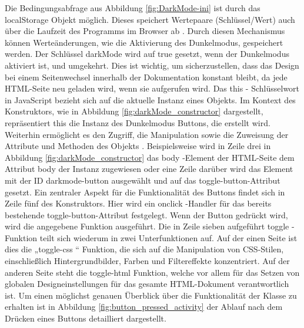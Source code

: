 \documentclass[11pt,a4paper]{report}
\begin{document}
\noindent
Die Bedingungsabfrage aus Abbildung \ref{fig:DarkMode-ini} ist durch das localStorage Objekt möglich. Dieses speichert Wertepaare (Schlüssel/Wert) auch über die Laufzeit des Programms im Browser ab \cite{localStorage_Objekt}. Durch diesen Mechanismus können Werteänderungen, wie die Aktivierung des Dunkelmodus, gespeichert werden. Der Schlüssel \glqq darkMode \grqq{} wird auf \glqq true \grqq{} gesetzt, wenn der Dunkelmodus aktiviert ist, und umgekehrt. Dies ist wichtig, um sicherzustellen, dass das Design bei einem Seitenwechsel innerhalb der Dokumentation konstant bleibt, da jede HTML-Seite neu geladen wird, wenn sie aufgerufen wird. Das \glqq this \grqq{}- Schlüsselwort in JavaScript bezieht sich auf die aktuelle Instanz eines Objekts. Im Kontext des Konstruktors, wie in Abbildung \ref{fig:darkMode_constructor} dargestellt, repräsentiert \glqq this \grqq{} die Instanz des Dunkelmodus Buttons, die erstellt wird. Weiterhin ermöglicht es den Zugriff, die Manipulation sowie die Zuweisung der Attribute und Methoden des Objekts \cite{this_keyword}. Beispielsweise wird in Zeile drei in Abbildung \ref{fig:darkMode_constructor} das \glqq body \grqq{}-Element der HTML-Seite dem Attribut \glqq body \grqq{} der Instanz zugewiesen oder eine Zeile darüber wird das Element mit der ID \glqq darkmode-button \grqq{} ausgewählt und auf das \glqq toggle-button\grqq{}-Attribut gesetzt. Ein zentraler Aspekt für die Funktionalität des Buttons findet sich in Zeile fünf des Konstruktors. Hier wird ein \glqq onclick \grqq{}-Handler für das bereits bestehende \glqq toggle-button\grqq{}-Attribut festgelegt. Wenn der Button gedrückt wird, wird die angegebene Funktion ausgeführt. Die in Zeile sieben aufgeführt \glqq toggle \grqq{}-Funktion teilt sich wiederum in zwei Unterfunktionen auf. Auf der einen Seite ist dies die „toggle-css “ Funktion, die sich auf die Manipulation von CSS-Stilen, einschließlich Hintergrundbilder, Farben und Filtereffekte konzentriert. Auf der anderen Seite steht die \glqq toggle-html \grqq{} Funktion, welche vor allem für das Setzen von globalen Designeinstellungen für das gesamte HTML-Dokument verantwortlich ist. Um einen möglichst genauen Überblick über die Funktionalität der Klasse zu erhalten ist in Abbildung \ref{fig:button_pressed_activity} der Ablauf nach dem Drücken eines Buttons detailliert dargestellt. 
\end{document}

